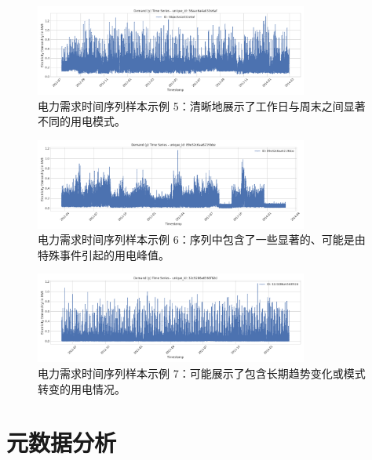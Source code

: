 \documentclass{article} %
\begin{document}
\begin{figure}[H]
    \centering
    \includegraphics[width=0.8\textwidth]{../plots/timeseries_sample_58aac6a4a032e6af.png}
    \caption{电力需求时间序列样本示例 5：清晰地展示了工作日与周末之间显著不同的用电模式。} %
    \label{fig:timeseries_sample_5}
\end{figure}

\begin{figure}[H]
    \centering
    \includegraphics[width=0.8\textwidth]{../plots/timeseries_sample_89e32c6aa6219bbe.png}
    \caption{电力需求时间序列样本示例 6：序列中包含了一些显著的、可能是由特殊事件引起的用电峰值。} %
    \label{fig:timeseries_sample_6}
\end{figure}

\begin{figure}[H]
    \centering
    \includegraphics[width=0.8\textwidth]{../plots/timeseries_sample_32c9286a6563f82d.png}
    \caption{电力需求时间序列样本示例 7：可能展示了包含长期趋势变化或模式转变的用电情况。} %
    \label{fig:timeseries_sample_7}
\end{figure}

\section{元数据分析}
\label{sec:metadata_analysis}
\end{document}
